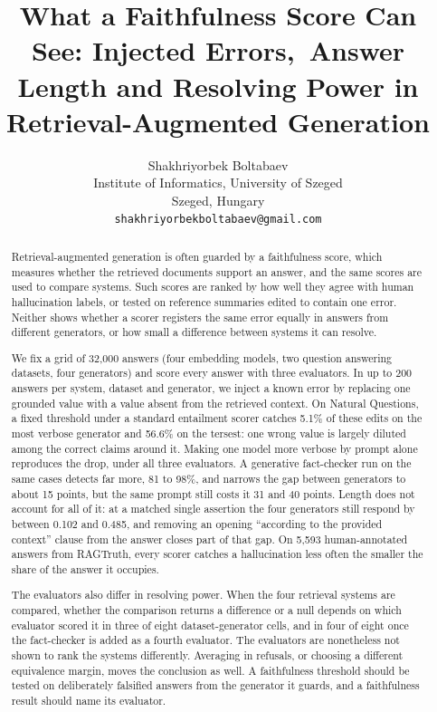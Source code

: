 \documentclass[11pt]{article}
\title{What a Faithfulness Score Can See: Injected Errors,\
       Answer Length and Resolving Power in Retrieval-Augmented Generation}
\author{Shakhriyorbek Boltabaev \\
  Institute of Informatics, University of Szeged \\
  Szeged, Hungary \\
  \texttt{shakhriyorbekboltabaev@gmail.com}}
\begin{document}
\maketitle

\begin{abstract}
Retrieval-augmented generation is often guarded by a faithfulness score, which measures whether the retrieved documents support an answer, and the same scores are used to compare systems. Such scores are ranked by how well they agree with human hallucination labels, or tested on reference summaries edited to contain one error. Neither shows whether a scorer registers the same error equally in answers from different generators, or how small a difference between systems it can resolve.

We fix a grid of 32,000 answers (four embedding models, two question answering datasets, four generators) and score every answer with three evaluators. In up to 200 answers per system, dataset and generator, we inject a known error by replacing one grounded value with a value absent from the retrieved context. On Natural Questions, a fixed threshold under a standard entailment scorer catches 5.1\% of these edits on the most verbose generator and 56.6\% on the tersest: one wrong value is largely diluted among the correct claims around it. Making one model more verbose by prompt alone reproduces the drop, under all three evaluators. A generative fact-checker run on the same cases detects far more, 81 to 98\%, and narrows the gap between generators to about 15 points, but the same prompt still costs it 31 and 40 points. Length does not account for all of it: at a matched single assertion the four generators still respond by between 0.102 and 0.485, and removing an opening ``according to the provided context'' clause from the answer closes part of that gap. On 5,593 human-annotated answers from RAGTruth, every scorer catches a hallucination less often the smaller the share of the answer it occupies.

The evaluators also differ in resolving power. When the four retrieval systems are compared, whether the comparison returns a difference or a null depends on which evaluator scored it in three of eight dataset-generator cells, and in four of eight once the fact-checker is added as a fourth evaluator. The evaluators are nonetheless not shown to rank the systems differently. Averaging in refusals, or choosing a different equivalence margin, moves the conclusion as well. A faithfulness threshold should be tested on deliberately falsified answers from the generator it guards, and a faithfulness result should name its evaluator.
\end{abstract}
\end{document}
